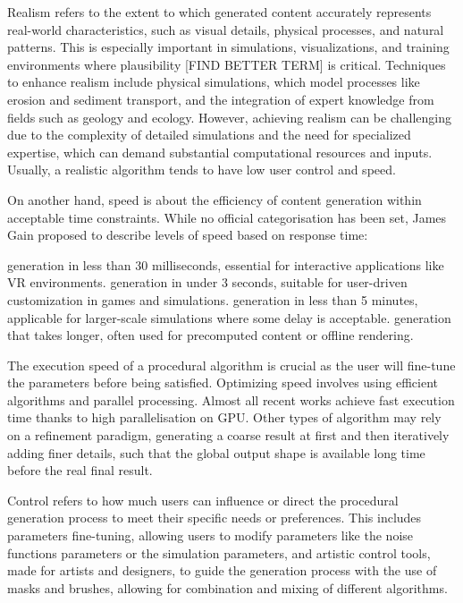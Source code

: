 
Realism refers to the extent to which generated content accurately represents real-world characteristics, such as visual details, physical processes, and natural patterns. This is especially important in simulations, visualizations, and training environments where plausibility [FIND BETTER TERM] is critical. Techniques to enhance realism include physical simulations, which model processes like erosion and sediment transport, and the integration of expert knowledge from fields such as geology and ecology. However, achieving realism can be challenging due to the complexity of detailed simulations and the need for specialized expertise, which can demand substantial computational resources and inputs. Usually, a realistic algorithm tends to have low user control and speed.

On another hand, speed is about the efficiency of content generation within acceptable time constraints. While no official categorisation has been set, James Gain proposed to describe levels of speed based on response time:
\begin{Itemize}
     generation in less than 30 milliseconds, essential for interactive applications like VR environments. 
     generation in under 3 seconds, suitable for user-driven customization in games and simulations. 
     generation in less than 5 minutes, applicable for larger-scale simulations where some delay is acceptable. 
     generation that takes longer, often used for precomputed content or offline rendering.
\end{Itemize}

The execution speed of a procedural algorithm is crucial as the user will fine-tune the parameters before being satisfied.
Optimizing speed involves using efficient algorithms and parallel processing. Almost all recent works achieve fast execution time thanks to high parallelisation on GPU. Other types of algorithm may rely on a refinement paradigm, generating a coarse result at first and then iteratively adding finer details, such that the global output shape is available long time before the real final result.

Control refers to how much users can influence or direct the procedural generation process to meet their specific needs or preferences. This includes parameters fine-tuning, allowing users to modify parameters like the noise functions parameters or the simulation parameters, and artistic control tools, made for artists and designers, to guide the generation process with the use of masks and brushes, allowing for combination and mixing of different algorithms.

